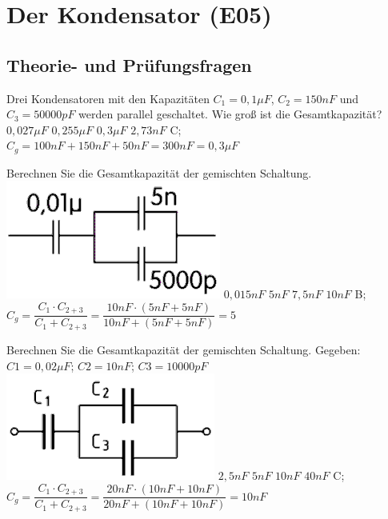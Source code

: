 \graphicspath{{e05_Kondensator/}}

\section{Der Kondensator (E05)}



\subsection{Theorie- und Prüfungsfragen}

{
Drei Kondensatoren mit den Kapazitäten $C_1 = 0,1\mu F$, $C_2 = 150nF$ und $C_3 = 50000pF$ werden parallel geschaltet. Wie groß ist die Gesamtkapazität?
}%
{$0,027\mu F$}%
{$0,255\mu F$}%
{$0,3\mu F$}%
{$2,73nF$}%
{C; $C_g = 100nF + 150nF + 50nF = 300nF = 0,3\mu F$}%


{
Berechnen Sie die Gesamtkapazität der gemischten Schaltung.\\
\includegraphics[scale=0.35]{TD105.png}
}%
{$0,015nF$}%
{$5nF$}%
{$7,5nF$}%
{$10nF$}%
{B; $C_g = \dfrac{C_1 \cdot C_{2+3}}{C_1 + C_{2+3}} = \dfrac{10nF \cdot (5nF + 5nF)}{10nF + (5nF + 5nF)} = 5$}%

{
Berechnen Sie die Gesamtkapazität der gemischten Schaltung. Gegeben: $C1 = 0,02\mu F$; $C2 = 10nF$; $C3 = 10000pF $ \\
\includegraphics[scale=0.35]{TD106.png}
}%
{$2,5nF$}%
{$5nF$}%
{$10nF$}%
{$40nF$}%
{C; $C_g = \dfrac{C_1 \cdot C_{2+3}}{C_1 + C_{2+3}} = \dfrac{20nF \cdot (10nF + 10nF)}{20nF + (10nF + 10nF)} = 10nF$}%

